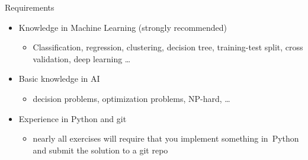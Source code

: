 % 
% 
\begin{frame}[c]{Requirements}

\begin{itemize}
  \item Knowledge in Machine Learning (strongly recommended)
  \begin{itemize}
    \item Classification, regression, clustering, decision tree, training-test split, cross validation, deep learning \ldots
  \end{itemize}
  \pause
  \item Basic knowledge in AI 
  \begin{itemize}
    \item decision problems, optimization problems, NP-hard, \ldots 
  \end{itemize}
  \pause
  \item Experience in Python and git 
  \begin{itemize}
    \item nearly all exercises will require that you implement something in~Python and submit the solution to a git repo
  \end{itemize}
\end{itemize}

\end{frame}
